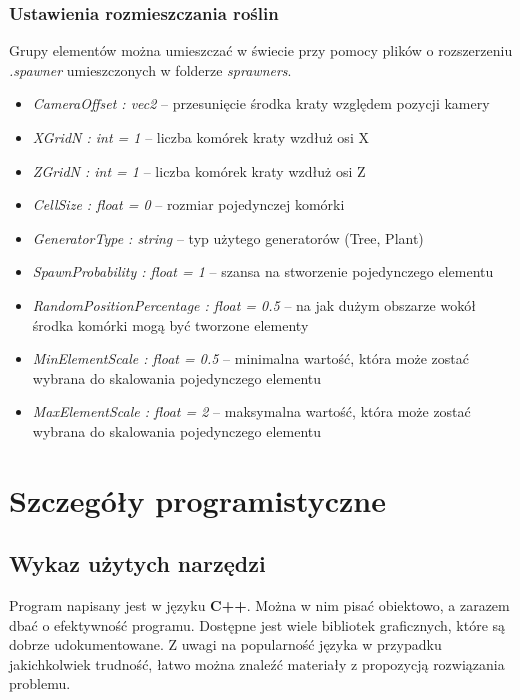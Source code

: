 \documentclass[inz,longabstract]{iithesis}
\begin{document}
        \subsection{Ustawienia rozmieszczania roślin}
        Grupy elementów można umieszczać w świecie przy pomocy plików o rozszerzeniu
        \textit{.spawner} umieszczonych w folderze \textit{sprawners}.
        \begin{itemize}
            \item \textit{CameraOffset : vec2} -- przesunięcie środka kraty względem pozycji kamery
            \item \textit{XGridN : int = 1} -- liczba komórek kraty wzdłuż osi X
            \item \textit{ZGridN : int = 1} -- liczba komórek kraty wzdłuż osi Z
            \item \textit{CellSize : float = 0} -- rozmiar pojedynczej komórki
            \item \textit{GeneratorType : string} -- typ użytego generatorów (Tree, Plant)
            \item \textit{SpawnProbability : float = 1} -- szansa na stworzenie pojedynczego elementu 
            \item \textit{RandomPositionPercentage : float = 0.5} -- na jak dużym obszarze wokół środka komórki mogą być tworzone elementy
            \item \textit{MinElementScale : float = 0.5} -- minimalna wartość, która może zostać wybrana do skalowania pojedynczego elementu
            \item \textit{MaxElementScale : float = 2} -- maksymalna wartość, która może zostać wybrana do skalowania pojedynczego elementu
        \end{itemize}
    
        
\chapter{Szczegóły programistyczne}
    \section{Wykaz użytych narzędzi}
        Program napisany jest w języku \textbf{C++}. Można w nim pisać obiektowo, a zarazem dbać o efektywność programu. Dostępne jest wiele bibliotek graficznych, które są dobrze udokumentowane. Z uwagi na popularność języka w przypadku jakichkolwiek trudność, łatwo można znaleźć materiały z propozycją rozwiązania problemu.        
        
\end{document}
